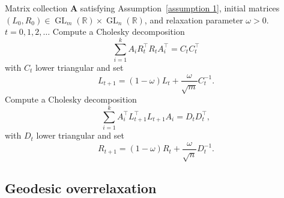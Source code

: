 \documentclass[a4paper]{article}
\newcommand{\R}{\mathbb{R}}
\newcommand{\bA}{\mathbf{A}}
\DeclareMathOperator{\GL}{GL}
\theoremstyle{definition}
\numberwithin{equation}{section}
\begin{document}
\begin{algorithm}[t]
\small
\caption{Cholesky Factor Fixed-Point Iteration with Overrelaxation (Cholesky-OR)}\label{algo: overrelaxation Cholesky}
\begin{algorithmic}[1]
\Input
Matrix collection $\bA$ satisfying Assumption~\ref{assumption 1},  initial matrices $(L_0, R_0) \in \GL_m(\R) \times \GL_n(\R)$, and relaxation parameter $\omega >0$.
\For
{$t = 0,1,2,\dots$}
    \State
    Compute a Cholesky decomposition
    \[
    \sum_{i=1}^k A_{i}^{} R_t^\top R_t^{} A_{i}^\top = C_t^{} C_t^\top
    \]
    with $C_t$ lower triangular and set
    \[
    L_{t+1} = (1-\omega) L_t + \frac{\omega}{\sqrt{m}} C_t^{-1}.
    \]
    \State
    Compute a Cholesky decomposition
    \[
    \sum_{i=1}^k A_{i}^{\top} L_{t+1}^\top L_{t+1}^{} A_{i}^{} = D_t^{} D_t^\top,
    \]
    with $D_t$ lower triangular and set
    \[
    R_{t+1} = (1-\omega ) R_t + \frac{\omega}{\sqrt{n}} D_t^{-1}.
    \]
\EndFor
\end{algorithmic}
\end{algorithm}

\subsection{Geodesic overrelaxation}\label{sec: overrelaxation Hilbert metric}
\end{document}
